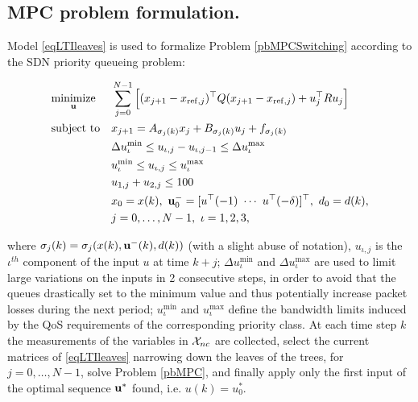 \subsection{MPC problem formulation.} Model \eqref{eqLTIleaves} is used to formalize Problem \ref{pbMPCSwitching} according to the SDN priority queueing problem:
\begin{problem}\label{pbMPC}

	\begin{equation*}
		\begin{aligned}
			& \underset{\bold u}
			{\text{minimize}}               & &  \sum_{j=0}^{N-1} \Big[(x_{j+1}-x_{\mathrm{ref},j})^\top Q (x_{j+1}-x_{\mathrm{ref},j}) + u^\top_{j} R u_{j}\Big]   \\
			& \text{subject to}             & &  x_{j+1}  =   A_{\sigma_j(k)} x_{j}+B_{\sigma_j(k)}  u_j+f_{\sigma_j(k)} \\
			&								& &  \Delta u_\iota^\mathrm{min} \leq u_{\iota,j} - u_{\iota,j-1} \leq \Delta u_\iota^\mathrm{max}             \\
			&								& &  u_\iota^\mathrm{min} \leq u_{\iota,j} \leq u_\iota^\mathrm{max}             \\
			&                               & &  u_{1,j} + u_{2,j} \leq 100			          		\\
			&                               & &  x_0 = x(k),\ \bold u^-_{0} = [u^\top(-1)\ \cdots\ u^\top(-\delta)]^\top,\ d_0 = d(k),\\
			&								& &  j = 0,\ldots,N-1,\ \iota = 1,2,3,                                 
		\end{aligned}
	\end{equation*}
\end{problem}
\noindent where $\sigma_j(k) = \sigma_j(x(k),\bold{u^-}(k),d(k))$ (with a slight abuse of notation), $u_{\iota,j}$ is the $\iota^{th}$ component of the input $u$ at time $k+j$; $\Delta u_\iota^\mathrm{min}$ and $\Delta u_\iota^\mathrm{max}$ are used to limit large variations on the inputs in 2 consecutive steps, in order to avoid that the queues drastically set to the minimum value and thus potentially increase packet losses during the next period; $u_\iota^\mathrm{min}$ and $u_\iota^\mathrm{max}$ define the bandwidth limits induced by the QoS requirements of the corresponding priority class. At each time step $k$ the measurements of the variables in $\mathcal{X}_{nc}$ are collected, select the current matrices of \eqref{eqLTIleaves} narrowing down the leaves of the trees, for $j = 0,\ldots,N-1$, solve Problem \eqref{pbMPC}, and finally apply only the first input of the optimal sequence $\bold u^*$ found, i.e. $u(k) = u_0^*$.

